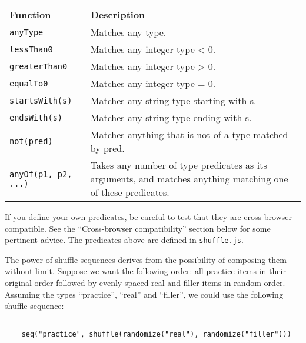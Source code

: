\documentclass[11pt,letterpaper]{article}
\begin{document}
\footnotesize
\begin{RaggedRight}
\sloppy
\begin{tabular}{|p{1.3235in}|p{4.1765in}|}
\hline
 \textbf{Function}            &  \textbf{Description}                                           \\
\hline
 \texttt{anyType}             &  Matches any type.                                       \\
\hline
 \texttt{lessThan0}           &  Matches any integer type < 0.                           \\
\hline
 \texttt{greaterThan0}        &  Matches any integer type > 0.                           \\
\hline
 \texttt{equalTo0}            &  Matches any integer type = 0.                           \\
\hline
 \texttt{startsWith(s)}       &  Matches any string type starting with s.                \\
\hline
 \texttt{endsWith(s)}         &  Matches any string type ending with s.                  \\
\hline
 \texttt{not(pred)}           &  Matches anything that is not of a type matched by pred. \\
\hline
 \texttt{anyOf(p1, p2, ...)}  &  Takes any number of type predicates as its arguments, and matches anything matching one of these predicates. 
\\\hline
\end{tabular}
\end{RaggedRight}
\fussy

\normalsize

If you define your own predicates, be careful to test that they are
cross-browser compatible. See the ``Cross-browser compatibility''
section below for some pertinent advice.  The predicates above are
defined in \texttt{shuffle.js}.

The power of shuffle sequences derives from the possibility of composing them
without limit. Suppose we want the following order: all practice items in their
original order followed by evenly spaced real and filler items in random order.
Assuming the types ``practice'', ``real'' and ``filler'', we could use the following
shuffle sequence:
\footnotesize\begin{verbatim}

    seq("practice", shuffle(randomize("real"), randomize("filler")))
\end{verbatim}

\smallskip\noindent\normalsize
\end{document}
